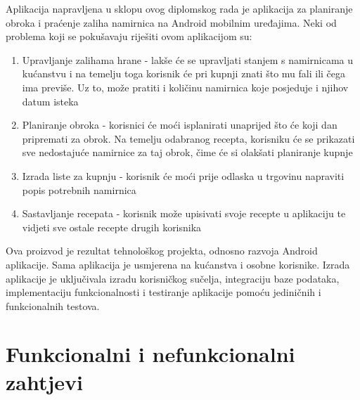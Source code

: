 \documentclass[diplomskirad]{fer}
\begin{document}
Aplikacija napravljena u sklopu ovog diplomskog rada je aplikacija za planiranje obroka i praćenje zaliha namirnica na Android mobilnim uređajima. Neki od problema koji se pokušavaju riješiti ovom aplikacijom su:
\begin{enumerate}
    \item Upravljanje zalihama hrane - lakše će se upravljati stanjem s namirnicama u kućanstvu i na temelju toga korisnik će pri kupnji znati što mu fali ili čega ima previše. Uz to, može pratiti i količinu namirnica koje posjeduje i njihov datum isteka
    \item Planiranje obroka - korisnici će moći isplanirati unaprijed što će koji dan pripremati za obrok. Na temelju odabranog recepta, korisniku će se prikazati sve nedostajuće namirnice za taj obrok, čime će si olakšati planiranje kupnje
    \item Izrada liste za kupnju - korisnik će moći prije odlaska u trgovinu napraviti popis potrebnih namirnica
    \item Sastavljanje recepata - korisnik može upisivati svoje recepte u aplikaciju te vidjeti sve ostale recepte drugih korisnika
\end{enumerate}

Ova proizvod je rezultat tehnološkog projekta, odnosno razvoja Android aplikacije. Sama aplikacija je usmjerena na kućanstva i osobne korisnike. Izrada aplikacije je uključivala izradu korisničkog sučelja, integraciju baze podataka, implementaciju funkcionalnosti i testiranje aplikacije pomoću jediničnih i funkcionalnih testova. 

\section{Funkcionalni i nefunkcionalni zahtjevi}
\end{document}
